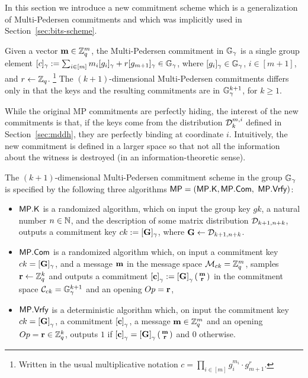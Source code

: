 In this section  we introduce a new commitment scheme which is a generalization of Multi-Pedersen commitments and which was implicitly used in Section~\ref{sec:bits-scheme}. 

Given a vector $\mathbf{m}\in\mathbb{Z}_q^m$, the Multi-Pedersen commitment in $\mathbb{G}_{\gamma}$ is a single group element $[c]_\gamma:=\sum_{i\in [m]} m_i[g_i]_\gamma+r[g_{m+1}]_\gamma \in\mathbb{G}_\gamma$, where $[g_i]_{\gamma}\in\mathbb{G}_\gamma$, $i\in[m+1]$, and $r\gets\mathbb{Z}_q$. \footnote{Written in the usual multiplicative notation $c=\prod_{i\in[m]}g_i^{m_i} \cdot g_{m+1}^r$.}  The $(k+1)$-dimensional Multi-Pedersen commitments 
differs only in that the keys and the resulting commitments are in 
$\mathbb{G}_{\gamma}^{k+1}$, for $k\geq 1$. 


While the original MP commitments are perfectly hiding, the interest of the new commitments is that, if the keys come from the distribution $\mathcal{D}_k^{m,i}$ defined in Section~\ref{sec:mddh}, they are perfectly binding at coordinate $i$. Intuitively, the new commitment is defined in a larger space so that not all the information about the witness is destroyed (in an information-theoretic sense). 

\begin{definition} The $(k+1)$-dimensional Multi-Pedersen commitment scheme in the group $\mathbb{G}_\gamma$ 
is specified by the following three algorithms 
	$\mathsf{MP}=(\mathsf{MP}.\mathsf{K},\mathsf{MP}.\mathsf{Com},$ $ \mathsf{MP}.\mathsf{Vrfy})$:
	\begin{itemize} 
		\item  $\mathsf{MP}.\mathsf{K}$ is a randomized algorithm, which on input the group key $gk$, a natural number $n \in \mathbb{N}$, and the description of some matrix distribution $\mathcal{D}_{k+1,n+k}$, 
		outputs a commitment key $ck:=[\mathbf{{G}}]_\gamma$, where $\mathbf{{G}} \gets \mathcal{D}_{k+1,n+k}$.
		\item $\mathsf{MP}.\mathsf{Com}$ is a randomized algorithm which, on input a commitment key $ck=[\mathbf{{G}}]_\gamma$, and a message 
		$\mathbf{m}$ in the message space $\mathcal{M}_{ck}=\mathbb{Z}_q^{m}$, samples $\mathbf{r} \gets \mathbb{Z}_q^k$ and outputs a commitment $\left[\mathbf{c}\right]_\gamma:=\left[\mathbf{{G}}\right]_\gamma\left(\begin{smallmatrix}\mathbf{m} \\ \mathbf{r}\end{smallmatrix}\right)$ in the commitment space $\mathcal{C}_{ck}=\mathbb{G}_\gamma^{k+1}$ and an opening $Op=\mathbf{r}$, 
		\item $\mathsf{MP}.\mathsf{Vrfy}$ is a deterministic algorithm which, on input the commitment key $ck=\left[\mathbf{{G}}\right]_\gamma$, a commitment $\left[\mathbf{c}\right]_\gamma$,  a message 
		$\mathbf{m} \in \mathbb{Z}_q^{m}$ and an opening $Op=\mathbf{r}\in\mathbb{Z}_q^k$, outputs $1$ if $\left[\mathbf{c}\right]_\gamma=\left[\mathbf{{G}}\right]_\gamma\left(\begin{smallmatrix}\mathbf{m} \\ \mathbf{r}\end{smallmatrix}\right)$
		and $0$ otherwise. 
	\end{itemize}
\end{definition}

